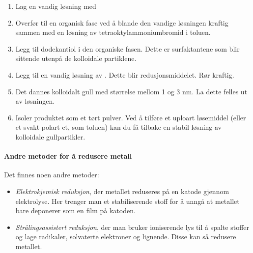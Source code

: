 \begin{enumerate}
	\item Lag en vandig løsning med 
	\item Overfør  til en organisk fase ved å blande den vandige løsningen kraftig sammen med en løsning av tetraoktylammoniumbromid i toluen.
	\item Legg til dodekantiol i den organiske fasen. Dette er surfaktantene som blir sittende utenpå de kolloidale partiklene.
	\item Legg til en vandig løsning av . Dette blir redusjonsmiddelet. Rør kraftig.
	\item Det dannes kolloidalt gull med størrelse mellom 1 og 3 nm. La dette felles ut av løsningen.
	\item Isoler produktet som et tørt pulver. Ved å tilføre et uploart løsemiddel (eller et svakt polart et, som toluen) kan du få tilbake en stabil løsning av kolloidale gullpartikler.
\end{enumerate}

\paragraph{Andre metoder for å redusere metall} Det finnes noen andre metoder:
\begin{itemize}
	\item \emph{Elektrokjemisk reduksjon}, der metallet reduseres på en katode gjennom elektrolyse. Her trenger man et stabiliserende stoff for å unngå at metallet bare deponerer som en film på katoden.
	\item \emph{Strålingsassistert reduksjon}, der man bruker ioniserende lys til å spalte stoffer og lage radikaler, solvaterte elektroner og lignende. Disse kan så redusere metallet.
\end{itemize}

